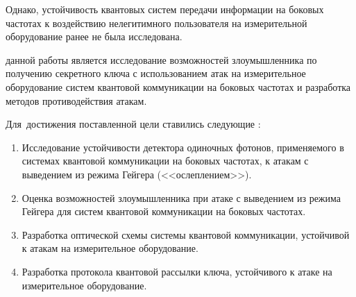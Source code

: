 Однако, устойчивость квантовых систем передачи информации на боковых частотах к воздействию нелегитимного пользователя на измерительной оборудование ранее не была исследована. 


{\aim} данной работы является исследование возможностей злоумышленника по получению секретного ключа с использованием атак на измерительное оборудование систем квантовой коммуникации на боковых частотах и разработка методов противодействия атакам.


Для~достижения поставленной цели ставились следующие {\tasks}:
\begin{enumerate}
  \item Исследование устойчивости детектора одиночных фотонов, применяемого в системах квантовой коммуникации на боковых частотах, к атакам с выведением из режима Гейгера (<<ослеплением>>). 

  \item Оценка возможностей злоумышленника при атаке с выведением из режима Гейгера для систем квантовой коммуникации на боковых частотах. 

  \item Разработка оптической схемы системы квантовой коммуникации, устойчивой к атакам на измерительное оборудование. 

  \item Разработка протокола квантовой рассылки ключа, устойчивого к атаке на измерительное оборудование. 

\end{enumerate}
